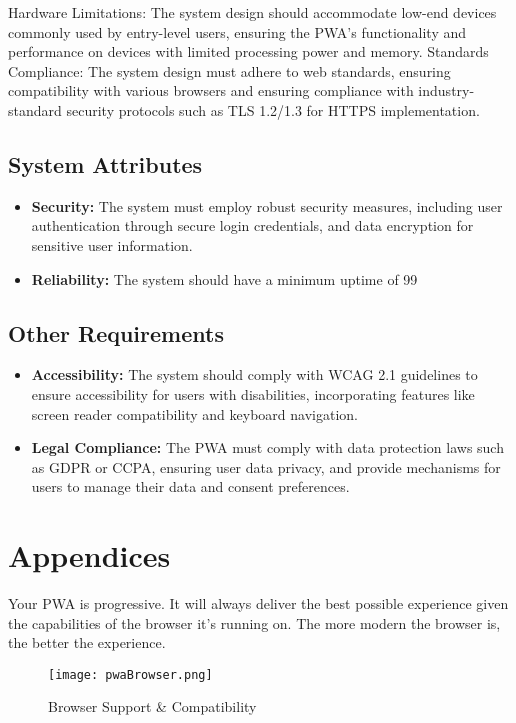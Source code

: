 \documentclass[12pt,a4paper, twosite]{article}
\begin{document}
Hardware Limitations: The system design should accommodate low-end devices commonly used by entry-level users, ensuring the PWA's functionality and performance on devices with limited processing power and memory.
Standards Compliance: The system design must adhere to web standards, ensuring compatibility with various browsers and ensuring compliance with industry-standard security protocols such as TLS 1.2/1.3 for HTTPS implementation.


\subsection{System Attributes}
\label{sec:orgd0babc0}

\begin{itemize}
  \item \textbf{Security: }The system must employ robust security measures, including user authentication through secure login credentials, and data encryption for sensitive user information.
  \item \textbf{Reliability: }The system should have a minimum uptime of 99%
\end{itemize}


\subsection{Other Requirements}
\label{sec:org31d2978}
\begin{itemize}
  \item \textbf{Accessibility: }The system should comply with WCAG 2.1 guidelines to ensure accessibility for users with disabilities, incorporating features like screen reader compatibility and keyboard navigation.
  \item \textbf{Legal Compliance: }The PWA must comply with data protection laws such as GDPR or CCPA, ensuring user data privacy, and provide mechanisms for users to manage their data and consent preferences.  
\end{itemize}

\newpage


\section{Appendices}
\label{sec:org75cea03}


Your PWA is progressive. It will always deliver the best possible 
experience given the capabilities of the browser it's running on. 
The more modern the browser is, the better the experience.

\begin{figure}[h]
  \centering
  \texttt{[image: pwaBrowser.png]}
  \caption{Browser Support \& Compatibility}
  \label{fig:browser_support}
\end{figure}
\end{document}
